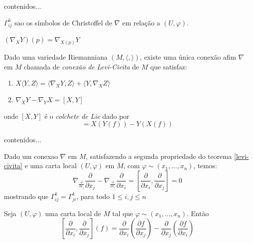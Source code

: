 \begin{demonstracao}
	contenidos...
\end{demonstracao}

\begin{observacao}
	$ \Gamma_{ij}^k $ sao os símbolos de Christoffel de $ \nabla $ em relação a $ (U,\varphi) $.
\end{observacao}

\begin{observacao}
	$(\nabla_X Y)(p) = \nabla_{X(p)} Y$
\end{observacao}

\begin{teorema}\label{levi-civita}
	Dado uma variedade Riemanniana $(M,\langle , \rangle)$, existe uma única conexão afim $\nabla$ em $M$ chamada de \emph{conexão de Levi-Civita} de $M$ que satisfaz:
	\begin{enumerate}
		\item $X \langle Y,Z \rangle = \langle \nabla_X Y,Z \rangle + \langle Y, \nabla_X Z\rangle$
		\item $\nabla_X Y - \nabla_Y X = [X,Y]$
	\end{enumerate}
	onde $[X,Y]$ é o \emph{colchete de Lie} dado por
	\begin{equation*}
		[X,Y] = X(Y(f)) - Y(X(f))
	\end{equation*}
\end{teorema}

\begin{demonstracao}
	contenidos...
\end{demonstracao}

\begin{observacao}
	Dado um conexao $\nabla$ em $M$, satisfazendo a segunda propriedade do teorema \ref{levi-civita} e uma carta local $(U,\varphi)$ em $M$, com $\varphi \sim (x_1, \ldots, x_n)$, temos:
	\begin{equation*}
		\nabla_{\frac{\partial}{\partial x_i}} \frac{\partial}{\partial x_j} - \nabla_{\frac{\partial}{\partial x_j}} \frac{\partial}{\partial x_i} = \left[ \frac{\partial}{\partial x_i}, \frac{\partial}{\partial x_j} \right] =0
	\end{equation*}	
	mostrando que $\Gamma_{ij}^k = \Gamma_{ji}^k$, para todo $1 \leq i,j \leq n$
\end{observacao}

\begin{observacao}
	Seja $(U,\varphi)$ uma carta local de $M$ tal que $\varphi \sim (x_1, \ldots,x_n)$. Então
	\begin{equation*}
		\left[\frac{\partial}{\partial x_i},\frac{\partial}{\partial x_j}\right](f) = \frac{\partial}{\partial x_i} \left(\frac{\partial f}{\partial x_j}\right) - \frac{\partial}{\partial x_j} \left(\frac{\partial f}{\partial x_i}\right)
	\end{equation*}
\end{observacao}

